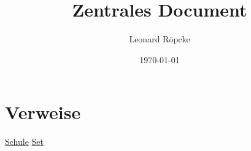 \documentclass[12pt,a4paper]{article}
\title{Zentrales Document}
\author{Leonard Röpcke}
\date{\today}
\begin{document}
\maketitle

\section{Verweise}
\href{https://leonard-roepcke.github.io/Knoledge-Archive/main_docs/school/school.pdf}{Schule}
\break
\href{https://leonard-roepcke.github.io/Knoledge-Archive/main_docs/central_document/knowledge/informatics/data_structure/set/set.tex}{Set}
\end{document}
